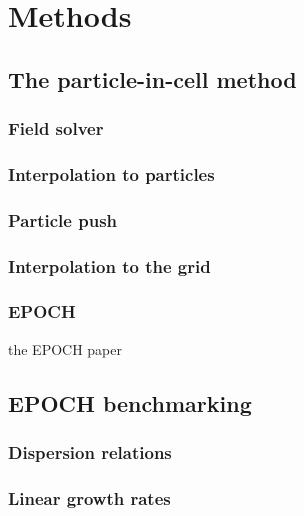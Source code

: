 \chapter{Methods}
\label{chp:methods}

\section{The particle-in-cell method}
\subsection{Field solver}
\subsection{Interpolation to particles}
\subsection{Particle push}
\subsection{Interpolation to the grid}
\subsection{EPOCH}
the EPOCH paper\cite{Arber2015}

\section{EPOCH benchmarking}
\subsection{Dispersion relations}
\subsection{Linear growth rates}




